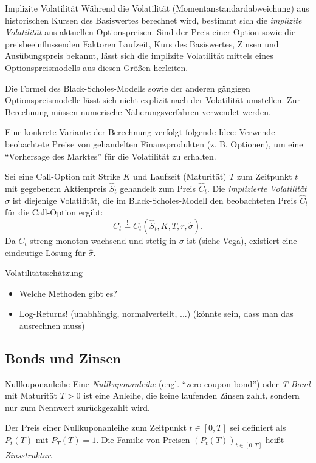 \begin{defi}{Implizite Volatilität}
    Während die Volatilität (Momentanstandardabweichung) aus historischen Kursen des Basiswertes berechnet wird, bestimmt sich die \emph{implizite Volatilität} aus aktuellen Optionspreisen.
    Sind der Preis einer Option sowie die preisbeeinflussenden Faktoren Laufzeit, Kurs des Basiswertes, Zinsen und Ausübungspreis bekannt, lässt sich die implizite Volatilität mittels eines Optionspreismodells aus diesen Größen herleiten.

    Die Formel des Black-Scholes-Modells sowie der anderen gängigen Optionspreismodelle lässt sich nicht explizit nach der Volatilität umstellen.
    Zur Berechnung müssen numerische Näherungsverfahren verwendet werden.

    Eine konkrete Variante der Berechnung verfolgt folgende Idee:
    Verwende beobachtete Preise von gehandelten Finanzprodukten (z. B. Optionen), um eine \enquote{Vorhersage des Marktes} für die Volatilität zu erhalten.

    Sei eine Call-Option mit Strike $K$ und Laufzeit (Maturität) $T$ zum Zeitpunkt $t$ mit gegebenem Aktienpreis $\hat{S}_t$ gehandelt zum Preis $\hat{C}_t$.
    Die \emph{implizierte Volatilität} $\hat{\sigma}$ ist diejenige Volatilität, die im Black-Scholes-Modell den beobachteten Preis $\hat{C}_t$ für die Call-Option ergibt:
    \[
        \hat{C}_t \stackrel{!}{=} C_t(\hat{S}_t, K, T, r, \hat{\sigma}).
    \]
    Da $C_t$ streng monoton wachsend und stetig in $\sigma$ ist (siehe Vega), existiert eine eindeutige Lösung für $\hat{\sigma}$.
\end{defi}

\begin{info}{Volatilitätsschätzung}
    \begin{itemize}
        \item Welche Methoden gibt es?
        \item Log-Returns! (unabhängig, normalverteilt, ...) (könnte sein, dass man das ausrechnen muss)
    \end{itemize}
\end{info}

\subsection{Bonds und Zinsen}

\begin{defi}{Nullkuponanleihe}
    Eine \emph{Nullkuponanleihe} (engl. \enquote{zero-coupon bond}) oder \emph{T-Bond} mit Maturität $T > 0$ ist eine Anleihe, die keine laufenden Zinsen zahlt, sondern nur zum Nennwert zurückgezahlt wird.

    Der Preis einer Nullkuponanleihe zum Zeitpunkt $t \in [0, T]$ sei definiert als $P_t(T)$ mit $P_T(T) = 1$.
    Die Familie von Preisen $(P_t(T))_{t \in [0, T]}$ heißt \emph{Zinsstruktur}.
\end{defi}

